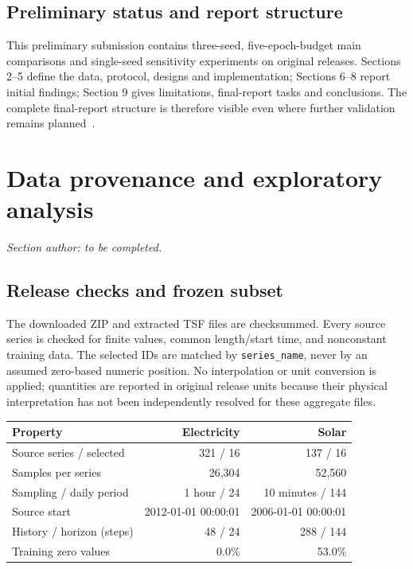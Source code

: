 \documentclass[10pt,a4paper]{article}
\begin{document}
\subsection{Preliminary status and report structure}
This preliminary submission contains three-seed, five-epoch-budget main comparisons and single-seed sensitivity experiments on original releases. Sections 2--5 define the data, protocol, designs and implementation; Sections 6--8 report initial findings; Section 9 gives limitations, final-report tasks and conclusions. The complete final-report structure is therefore visible even where further validation remains planned~\cite{course}.

\clearpage
\section{Data provenance and exploratory analysis}
\noindent\textit{Section author: to be completed.}


\subsection{Release checks and frozen subset}
The downloaded ZIP and extracted TSF files are checksummed. Every source series is checked for finite values, common length/start time, and nonconstant training data. The selected IDs are matched by \texttt{series\_name}, never by an assumed zero-based numeric position. No interpolation or unit conversion is applied; quantities are reported in original release units because their physical interpretation has not been independently resolved for these aggregate files.
\begin{center}\small
\begin{tabular}{lrr}\toprule
Property & Electricity & Solar\\\midrule
Source series / selected & 321 / 16 & 137 / 16\\
Samples per series & 26,304 & 52,560\\
Sampling / daily period & 1 hour / 24 & 10 minutes / 144\\
Source start & 2012-01-01 00:00:01 & 2006-01-01 00:00:01\\
History / horizon (steps) & 48 / 24 & 288 / 144\\
Training zero values & 0.0\% & 53.0\%\\
\bottomrule\end{tabular}\end{center}
\end{document}
